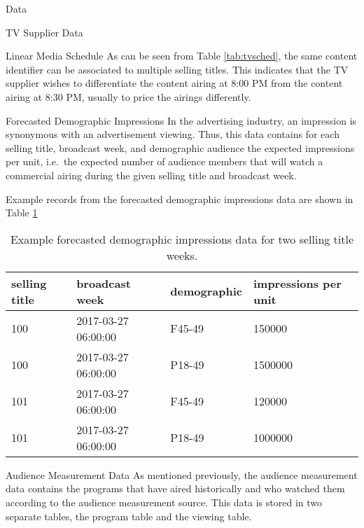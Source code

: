 \begin{chapter}{Data}
\begin{section}{TV Supplier Data}
\begin{subsection}{Linear Media Schedule}
    As can be seen from Table \ref{tab:tvsched}, the same content identifier can be associated
    to multiple selling titles. This indicates that the TV supplier wishes to differentiate
    the content airing at 8:00 PM from the content airing at 8:30 PM, usually to price the airings differently.

  \end{subsection}

  \begin{subsection}{Forecasted Demographic Impressions}
    In the advertising industry, an impression is synonymous with an advertisement viewing.
    Thus, this data contains for each selling title, broadcast week, and demographic audience the expected impressions per unit, i.e.\
    the expected number of audience members that will watch a commercial airing during the given selling title and broadcast week.

    Example records from the forecasted demographic impressions data are shown in Table \ref{tab:tvdem}

    \begin{table}[h!]
      \centering
        \begin{tabular}{llll}
          selling title & broadcast week & demographic & impressions per unit \\
          \hline
          100 & 2017-03-27 06:00:00 & F45-49 & 150000 \\
          100 & 2017-03-27 06:00:00 & P18-49 & 1500000 \\
          101 & 2017-03-27 06:00:00 & F45-49 & 120000 \\
          101 & 2017-03-27 06:00:00 & P18-49 & 1000000 \\
        \end{tabular}
      \caption{Example forecasted demographic impressions data for two selling title weeks.}\label{tab:tvdem}
    \end{table}
  \end{subsection}
\end{section}


\begin{section}{Audience Measurement Data}
  As mentioned previously, the audience measurement data contains the programs that
  have aired historically and who watched them according to the audience measurement source.
  This data is stored in two separate tables, the program table and the viewing table.


\end{section}
\end{chapter}
